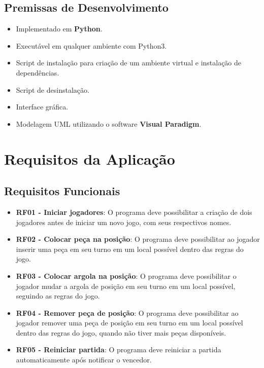 \documentclass[12pt]{article}
\begin{document}
\subsection{Premissas de Desenvolvimento}
\begin{itemize}
    \item Implementado em \textbf{Python}.
    \item Executável em qualquer ambiente com Python3.
    \item Script de instalação para criação de um ambiente virtual e instalação de dependências.
    \item Script de desinstalação.
    \item Interface gráfica.
    \item Modelagem UML utilizando o software \textbf{Visual Paradigm}.
\end{itemize}

\newpage

\section{Requisitos da Aplicação}
\subsection{Requisitos Funcionais}

\begin{itemize}
    \item \textbf{RF01 - Iniciar jogadores}: O programa deve possibilitar a criação de dois jogadores antes de iniciar um novo jogo, com seus respectivos nomes.
    \item \textbf{RF02 - Colocar peça na posição}: O programa deve possibilitar ao jogador inserir uma peça em seu turno em um local possível dentro das regras do jogo.
    \item \textbf{RF03 - Colocar argola na posição}: O programa deve possibilitar o jogador mudar a argola de posição em seu turno em um local possível, seguindo as regras do jogo.
    \item \textbf{RF04 - Remover peça de posição}: O programa deve possibilitar ao jogador remover uma peça de posição em seu turno em um local possível dentro das regras do jogo, quando não tiver mais peças disponíveis.
    \item \textbf{RF05 - Reiniciar partida}: O programa deve reiniciar a partida automaticamente após notificar o vencedor.
\end{itemize}
\end{document}
